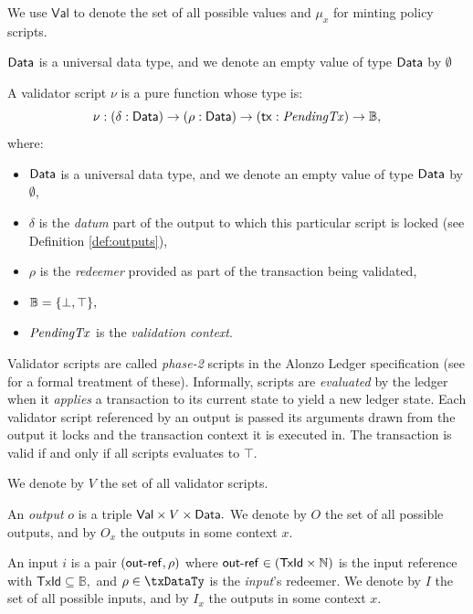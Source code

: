 We use $\mathsf{Val}$ to denote the set of all possible values and  $\mu_x$ for minting policy scripts.

\begin{definition}

 $\mathsf{Data}$ is a universal data type, and we denote an empty value of type $\mathsf{Data}$ by $\emptyset$

A validator script $\nu$ is a pure function whose type is:
\[
  \nu : (\delta : \mathsf{Data}) \to (\rho : \mathsf{Data}) \to (\mathsf{tx} : \mathit{PendingTx})
  \to\mathbb{B},
\]
where: 
\begin{itemize}
    \item $\mathsf{Data}$ is a universal data type, and we denote an empty value of type $\mathsf{Data}$ by $\emptyset$,  
    \item $\delta$ is the \emph{datum} part of the output to which this particular script is locked (see Definition \ref{def:outputs}),
    \item $\rho$ is the \emph{redeemer} provided as part of the transaction being validated,
    \item $\mathbb{B} = \{\bot, \top\},$
    \item $\mathit{PendingTx}$ is the \emph{validation context}.
\end{itemize}
\end{definition}

Validator scripts are called \emph{phase-2} scripts in the Alonzo Ledger specification (see \cite{alozon-spec} for a formal treatment of these). Informally, scripts are \emph{evaluated} by the ledger when it \emph{applies} a transaction to its current state to yield a new ledger state. Each validator script referenced by an output is passed its arguments drawn from the output it locks and the transaction context it is executed in. The transaction is valid if and only if all scripts evaluates to $\top.$

We denote by $V$ the set of all validator scripts.

\begin{definition}[Outputs]
\label{def:outputs}
An \emph{output} $o$ is a triple $\mathsf{Val} \times V \times \mathsf{Data}.$
We denote by $O$ the set of all possible outputs, and by $O_x$ the outputs in some context $x$.
\end{definition}

\begin{definition}[Inputs]
An input $i$ is a pair $(\mathsf{out\textsf{-}{}ref}, \rho)$ where 
$\mathsf{out\textsf{-}{}ref} \in (\mathsf{TxId} \times \mathbb{N})$ is the input reference with $\mathsf{TxId} \subseteq \mathbb{B},$ and $\rho \in \txDataTy$ is the \emph{input}'s redeemer.  We denote by $I$ the set of all possible inputs, and by $I_x$ the outputs in some context $x$.
\end{definition}

